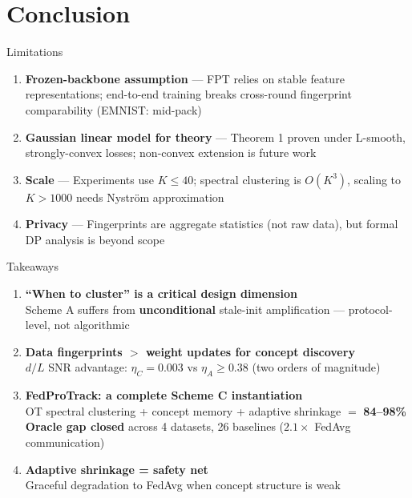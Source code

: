 \documentclass[aspectratio=169,11pt]{beamer}
\begin{document}
\section{Conclusion}

\begin{frame}{Limitations}

\begin{enumerate}\setlength\itemsep{4pt}
  \item \textbf{Frozen-backbone assumption} ---
    FPT relies on stable feature representations; end-to-end training breaks cross-round fingerprint comparability (EMNIST: mid-pack)

  \item \textbf{Gaussian linear model for theory} ---
    Theorem 1 proven under L-smooth, strongly-convex losses; non-convex extension is future work

  \item \textbf{Scale} ---
    Experiments use $K \leq 40$; spectral clustering is $O(K^3)$, scaling to $K > 1000$ needs Nystr\"{o}m approximation

  \item \textbf{Privacy} ---
    Fingerprints are aggregate statistics (not raw data), but formal DP analysis is beyond scope
\end{enumerate}
\end{frame}

\begin{frame}{Takeaways}

\begin{enumerate}\setlength\itemsep{4pt}
  \item \textbf{``When to cluster'' is a critical design dimension}\\
    Scheme A suffers from \textbf{unconditional} stale-init amplification --- protocol-level, not algorithmic

  \item \textbf{Data fingerprints $>$ weight updates for concept discovery}\\
    $d/L$ SNR advantage: $\eta_C = 0.003$ vs $\eta_A \geq 0.38$ (two orders of magnitude)

  \item \textbf{FedProTrack: a complete Scheme C instantiation}\\
    OT spectral clustering + concept memory + adaptive shrinkage $=$ \textbf{84--98\% Oracle gap closed} across 4 datasets, 26 baselines ($2.1\times$ FedAvg communication)

  \item \textbf{Adaptive shrinkage = safety net}\\
    Graceful degradation to FedAvg when concept structure is weak
\end{enumerate}
\end{frame}
\end{document}
